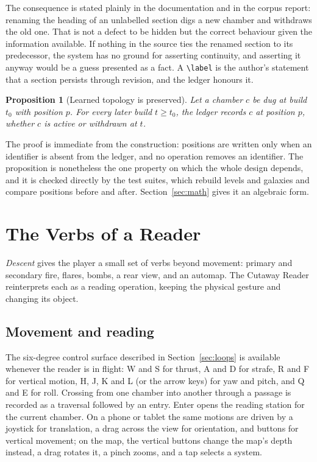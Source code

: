 \documentclass[11pt]{article}
\newtheorem{proposition}{Proposition}
\theoremstyle{remark}
\begin{document}
The consequence is stated plainly in the documentation and in the corpus report: renaming the heading of an unlabelled section digs a new chamber and withdraws the old one. That is not a defect to be hidden but the correct behaviour given the information available. If nothing in the source ties the renamed section to its predecessor, the system has no ground for asserting continuity, and asserting it anyway would be a guess presented as a fact. A \texttt{\textbackslash label} is the author's statement that a section persists through revision, and the ledger honours it.

\begin{proposition}[Learned topology is preserved]
\label{prop:preserved}
Let a chamber $c$ be dug at build $t_0$ with position $p$. For every later build $t \ge t_0$, the ledger records $c$ at position $p$, whether $c$ is active or withdrawn at $t$.
\end{proposition}

The proof is immediate from the construction: positions are written only when an identifier is absent from the ledger, and no operation removes an identifier. The proposition is nonetheless the one property on which the whole design depends, and it is checked directly by the test suites, which rebuild levels and galaxies and compare positions before and after. Section~\ref{sec:math} gives it an algebraic form.

\section{The Verbs of a Reader}
\label{sec:verbs}

\emph{Descent} gives the player a small set of verbs beyond movement: primary and secondary fire, flares, bombs, a rear view, and an automap. The Cutaway Reader reinterprets each as a reading operation, keeping the physical gesture and changing its object.

\subsection{Movement and reading}

The six-degree control surface described in Section~\ref{sec:loops} is available whenever the reader is in flight: W and S for thrust, A and D for strafe, R and F for vertical motion, H, J, K and L (or the arrow keys) for yaw and pitch, and Q and E for roll. Crossing from one chamber into another through a passage is recorded as a traversal followed by an entry. Enter opens the reading station for the current chamber. On a phone or tablet the same motions are driven by a joystick for translation, a drag across the view for orientation, and buttons for vertical movement; on the map, the vertical buttons change the map's depth instead, a drag rotates it, a pinch zooms, and a tap selects a system.
\end{document}
